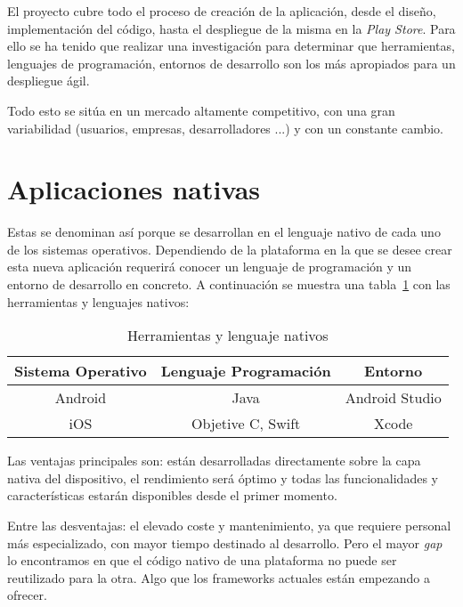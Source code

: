 
El proyecto cubre todo el proceso de creación de la aplicación, desde el diseño, implementación del código, hasta el despliegue de la misma en la \emph{Play Store}. Para ello se ha tenido que realizar una investigación para determinar que herramientas, lenguajes de programación, entornos de desarrollo son los más apropiados para un despliegue ágil.

Todo esto se sitúa en un mercado altamente competitivo, con una gran variabilidad (usuarios, empresas, desarrolladores ...) y con un constante cambio. 

\section{Aplicaciones nativas}
Estas se denominan así porque se desarrollan en el lenguaje nativo de cada uno de los sistemas operativos. Dependiendo de la plataforma en la que se desee crear esta nueva aplicación requerirá conocer un lenguaje de programación y un entorno de desarrollo en concreto. A continuación se muestra una tabla~\ref{table:nativos} con las herramientas y lenguajes nativos:

\begin{table}[H]
	\begin{center}
		\begin{tabular}{ccc}
			\hline
			Sistema Operativo                        & Lenguaje Programación & Entorno \\ \hline
			Android				    & Java      & Android Studio					\\
			iOS			    & Objetive C, Swift       & Xcode						\\ \hline
		\end{tabular}
		\caption{Herramientas y lenguaje nativos}
		\label{table:nativos}
	\end{center}
\end{table}

Las ventajas principales son: están desarrolladas directamente sobre la capa nativa del dispositivo, el rendimiento será óptimo y todas las funcionalidades y características estarán disponibles desde el primer momento.

Entre las desventajas: el elevado coste y mantenimiento, ya que requiere personal más especializado, con mayor tiempo destinado al desarrollo. Pero el mayor \emph{gap} lo encontramos en que el código nativo de una plataforma no puede ser reutilizado para la otra. Algo que los frameworks actuales están empezando a ofrecer.

